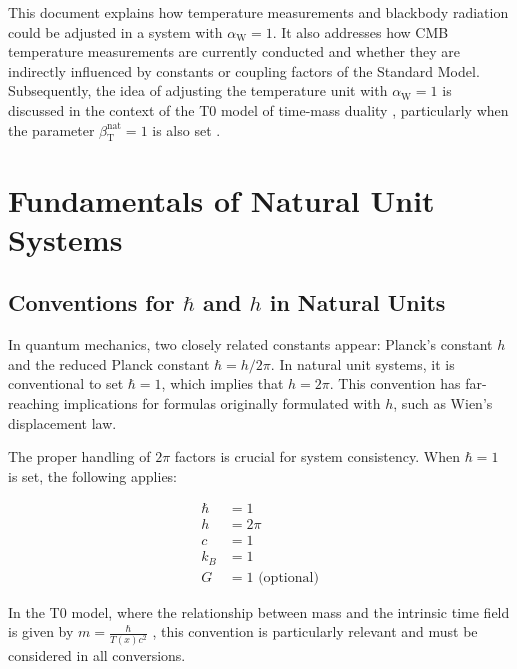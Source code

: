 \documentclass[12pt,a4paper]{article}
\newcommand{\Tfield}{T(x)}
\newcommand{\betaT}{\beta_{\text{T}}}
\newcommand{\alphaW}{\alpha_{\text{W}}}
\begin{document}
	This document explains how temperature measurements and blackbody radiation could be adjusted in a system with \(\alphaW = 1\). It also addresses how CMB temperature measurements are currently conducted and whether they are indirectly influenced by constants or coupling factors of the Standard Model. Subsequently, the idea of adjusting the temperature unit with \(\alphaW = 1\) is discussed in the context of the T0 model of time-mass duality \cite{pascher_galaxies_2025}, particularly when the parameter \(\betaT^{\text{nat}} = 1\) is also set \cite{pascher_params_2025}.
	
	\section{Fundamentals of Natural Unit Systems}
	\label{sec:foundations}
	
	\subsection{Conventions for \(\hbar\) and \(h\) in Natural Units}
	\label{subsec:conventions}
	
	In quantum mechanics, two closely related constants appear: Planck's constant \(h\) and the reduced Planck constant \(\hbar = h/2\pi\). In natural unit systems, it is conventional to set \(\hbar = 1\), which implies that \(h = 2\pi\). This convention has far-reaching implications for formulas originally formulated with \(h\), such as Wien's displacement law.
	
	The proper handling of \(2\pi\) factors is crucial for system consistency. When \(\hbar = 1\) is set, the following applies:
	
	\begin{tcolorbox}[colback=blue!5!white,colframe=blue!75!black,title=Conventions in Natural Units]
		\begin{align}
			\hbar &= 1 \\
			h &= 2\pi \\
			c &= 1 \\
			k_B &= 1 \\
			G &= 1 \text{ (optional)}
		\end{align}
	\end{tcolorbox}
	
	In the T0 model, where the relationship between mass and the intrinsic time field is given by \(m = \frac{\hbar}{\Tfield c^2}\) \cite{pascher_galaxies_2025}, this convention is particularly relevant and must be considered in all conversions.
	
\end{document}
